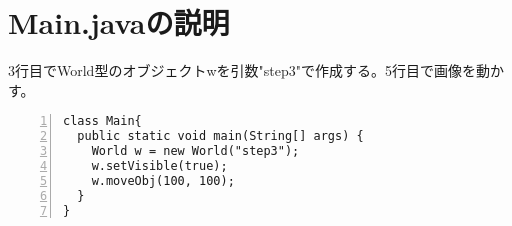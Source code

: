 \documentclass[uplatex]{jsarticle}
\begin{document}
\section{Main.javaの説明}
3行目でWorld型のオブジェクトwを引数"step3"で作成する。5行目で画像を動かす。

\begin{lstlisting}[caption=World.java, numbers=left]
class Main{
  public static void main(String[] args) {
    World w = new World("step3");
    w.setVisible(true);
    w.moveObj(100, 100);
  }
}
\end{lstlisting}
\end{document}
